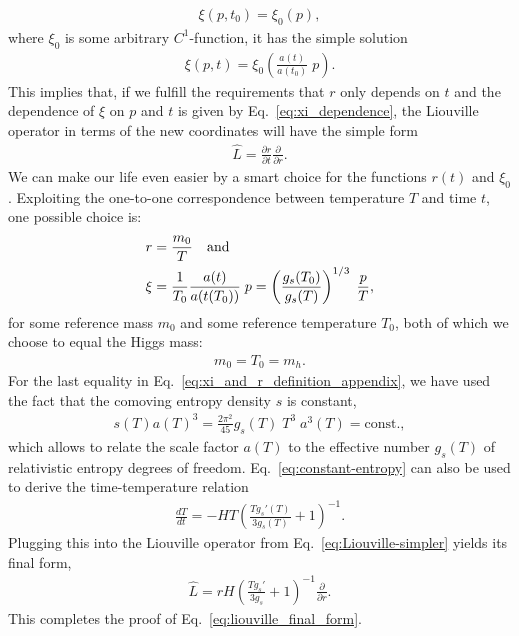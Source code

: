 \begin{align}
\xi(p,t_0)=\xi_0(p),
\end{align}
where $\xi_0$ is some arbitrary $C^1$-function, it has the simple solution
\begin{align}
 \xi(p,t)=\xi_0\left(\frac{a(t)}{a(t_0)}\; p\right).
 \label{eq:xi_dependence}
\end{align}
This implies that, if we fulfill the requirements that $r$ only depends on $t$ and the dependence of $\xi$ on $p$ and $t$ is given by Eq.~\eqref{eq:xi_dependence}, the Liouville operator in terms of the new coordinates will have the simple form
\begin{align}
 \hat{L} = \frac{\partial r}{\partial t}\frac{\partial}{\partial r}.
 \label{eq:Liouville-simpler}
\end{align}
We can make our life even easier by a smart choice for the functions $r(t)$ and $\xi_0$. Exploiting the one-to-one correspondence between temperature $T$ and time $t$, one possible choice is:
\begin{align}\nonumber
 r &= \frac{m_0}{T}\ \ \ {\rm and}\\
 \xi &= \frac{1}{T_0}\frac{a(t)}{a(t(T_0))} \; p = \left( \frac{g_s(T_0)}{g_s(T)} \right)^{1/3}\;\frac{p}{T},
 \label{eq:xi_and_r_definition_appendix}
\end{align}
for some reference mass $m_0$ and some reference temperature $T_0$, both of which we choose to equal the Higgs mass:
\begin{align}
m_0 = T_0 = m_h.
\end{align}
For the last equality in Eq.~\eqref{eq:xi_and_r_definition_appendix}, we have used the fact that the comoving entropy density $s$ is constant,
\begin{align}
 s(T)a(T)^3 = \frac{2\pi^2}{45} g_s(T) \; T^3 \; a^3(T) = \text{const.},
 \label{eq:constant-entropy}
\end{align}
which allows to relate the scale factor $a(T)$ to the effective number $g_s(T)$ of relativistic entropy degrees of freedom. Eq.~\eqref{eq:constant-entropy} can also be used to derive the time-temperature relation
\begin{align}
\frac{dT}{dt}=-HT\left( \frac{T g_s'(T)}{3 g_s(T)} + 1 \right)^{-1}.
\end{align}
Plugging this into the Liouville operator from Eq.~\eqref{eq:Liouville-simpler} yields its final form,
\begin{align}
\hat{L} = r H \left( \frac{T g_s'}{3 g_s} + 1 \right)^{-1}\frac{\partial}{\partial r}.
\end{align}
This completes the proof of Eq.~\eqref{eq:liouville_final_form}.